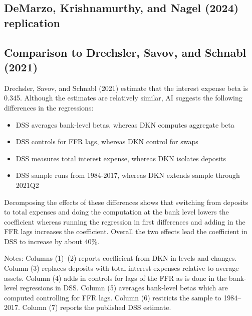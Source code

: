 \documentclass[11pt]{article}
\begin{document}
\subsection{DeMarzo, Krishnamurthy, and Nagel (2024) replication}

\begin{table}[H]
    \centering
    \caption{Panel A: Regression in levels}
    \label{tab:dkn_levels}
    
\end{table}

\begin{table}[H]
    \centering
    \caption{Panel B: Regression in changes}
    \label{tab:dkn_changes}
    
\end{table}

\subsection{Comparison to Drechsler, Savov, and Schnabl (2021)}

Drechsler, Savov, and Schnabl (2021) estimate that the interest expense beta is 0.345. Although the estimates are relatively similar, AI suggests the following differences in the regressions:

\begin{itemize}
    \item DSS averages bank-level betas, whereas DKN computes aggregate beta
    \item DSS controls for FFR lags, whereas DKN control for swaps
    \item DSS measures total interest expense, whereas DKN isolates deposits
    \item DSS sample runs from 1984-2017, whereas DKN extends sample through 2021Q2
\end{itemize}

Decomposing the effects of these differences shows that switching from deposits to total expenses and doing the computation at the bank level lowers the coefficient whereas running the regression in first differences and adding in the FFR lags increases the coefficient. Overall the two effects lead the coefficient in DSS to increase by about 40\%. 

\begin{table}[H]
    \centering
    \caption{Sequential comparison of DKN and DSS estimates}
    \label{tab:dss_dkn_comparison}
    \resizebox{\textwidth}{!}{%
    }
    \par\smallskip
    \begin{minipage}{\textwidth}
        \footnotesize
        Notes: Columns (1)--(2) reports coefficient from DKN in levels and changes. Column (3) replaces deposits with total interest expenses relative to average assets. Column (4) adds in controls for lags of the FFR as is done in the bank-level regressions in DSS. Column (5) averages bank-level betas which are computed controlling for FFR lags. Column (6) restricts the sample to 1984--2017. Column (7) reports the published DSS estimate.
    \end{minipage}
\end{table}
\end{document}
